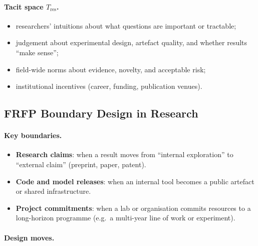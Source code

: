 \paragraph{Tacit space \(T_{\mathrm{res}}\).}

\begin{itemize}
  \item researchers’ intuitions about what questions are important or
        tractable;
  \item judgement about experimental design, artefact quality, and
        whether results ``make sense'';
  \item field-wide norms about evidence, novelty, and acceptable risk;
  \item institutional incentives (career, funding, publication venues).
\end{itemize}

\subsection{FRFP Boundary Design in Research}

\paragraph{Key boundaries.}

\begin{itemize}
  \item \textbf{Research claims}:
        when a result moves from ``internal exploration'' to
        ``external claim'' (preprint, paper, patent).
  \item \textbf{Code and model releases}:
        when an internal tool becomes a public artefact or shared
        infrastructure.
  \item \textbf{Project commitments}:
        when a lab or organisation commits resources to a long-horizon
        programme (e.g.\ a multi-year line of work or experiment).
\end{itemize}

\paragraph{Design moves.}

